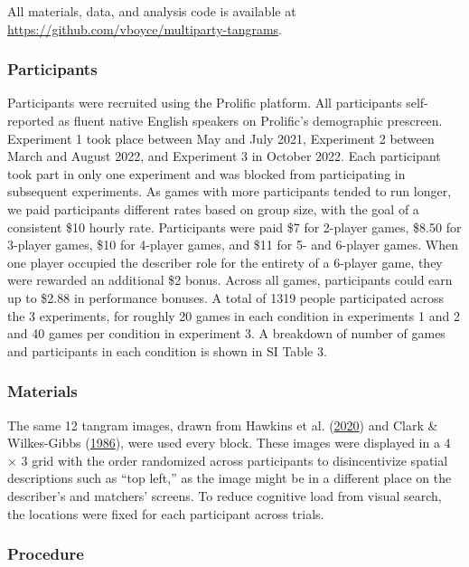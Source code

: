 \documentclass[
  english,
]{article}
\begin{document}
All materials, data, and analysis code is available at \url{https://github.com/vboyce/multiparty-tangrams}.

\hypertarget{participants}{%
\subsubsection{Participants}\label{participants}}

Participants were recruited using the Prolific platform.
All participants self-reported as fluent native English speakers on Prolific's demographic prescreen.
Experiment 1 took place between May and July 2021, Experiment 2 between March and August 2022, and Experiment 3 in October 2022.
Each participant took part in only one experiment and was blocked from participating in subsequent experiments.
As games with more participants tended to run longer, we paid participants different rates based on group size, with the goal of a consistent \$10 hourly rate. Participants were paid \$7 for 2-player games, \$8.50 for 3-player games, \$10 for 4-player games, and \$11 for 5- and 6-player games. When one player occupied the describer role for the entirety of a 6-player game, they were rewarded an additional \$2 bonus. Across all games, participants could earn up to \$2.88 in performance bonuses. A total of 1319 people participated across the 3 experiments, for roughly 20 games in each condition in experiments 1 and 2 and 40 games per condition in experiment 3. A breakdown of number of games and participants in each condition is shown in SI Table 3.

\hypertarget{materials}{%
\subsubsection{Materials}\label{materials}}

The same 12 tangram images, drawn from Hawkins et al. (\protect\hyperlink{ref-hawkins2020}{2020}) and Clark \& Wilkes-Gibbs (\protect\hyperlink{ref-clark1986}{1986}), were used every block.
These images were displayed in a 4 \(\times\) 3 grid with the order randomized across participants to disincentivize spatial descriptions such as ``top left,'' as the image might be in a different place on the describer's and matchers' screens.
To reduce cognitive load from visual search, the locations were fixed for each participant across trials.

\hypertarget{procedure}{%
\subsubsection{Procedure}\label{procedure}}
\end{document}
